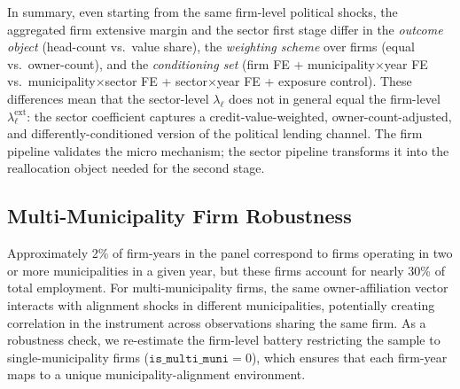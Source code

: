 \documentclass{article}
\begin{document}
In summary, even starting from the same firm-level political shocks, the
aggregated firm extensive margin and the sector first stage differ in the
\emph{outcome object} (head-count vs.\ value share), the \emph{weighting
scheme} over firms (equal vs.\ owner-count), and the \emph{conditioning set}
(firm FE + municipality$\times$year FE vs.\ municipality$\times$sector FE +
sector$\times$year FE + exposure control).
These differences mean that the sector-level $\lambda_\ell$ does not in
general equal the firm-level $\lambda^{\text{ext}}_\ell$: the sector
coefficient captures a credit-value-weighted, owner-count-adjusted, and
differently-conditioned version of the political lending channel.
The firm pipeline validates the micro mechanism; the sector pipeline
transforms it into the reallocation object needed for the second stage.

\subsection{Multi-Municipality Firm Robustness}

Approximately 2\% of firm-years in the panel correspond to firms operating in two or more municipalities in a given year, but these firms account for nearly 30\% of total employment.
For multi-municipality firms, the same owner-affiliation vector interacts with
alignment shocks in different municipalities, potentially creating correlation
in the instrument across observations sharing the same firm.
As a robustness check, we re-estimate the firm-level battery restricting
the sample to single-municipality firms ($\texttt{is\_multi\_muni} = 0$),
which ensures that each firm-year maps to a unique municipality-alignment environment.
\end{document}
